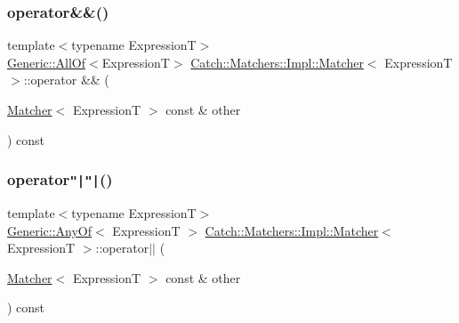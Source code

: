 \subsubsection{\texorpdfstring{operator\&\&()}{operator\&\&()}}
{\footnotesize\ttfamily template$<$typename ExpressionT$>$ \\
\hyperlink{class_catch_1_1_matchers_1_1_impl_1_1_generic_1_1_all_of}{Generic\+::\+All\+Of}$<$ExpressionT$>$ \hyperlink{struct_catch_1_1_matchers_1_1_impl_1_1_matcher}{Catch\+::\+Matchers\+::\+Impl\+::\+Matcher}$<$ ExpressionT $>$\+::operator \&\& (\begin{DoxyParamCaption}\item[{\hyperlink{struct_catch_1_1_matchers_1_1_impl_1_1_matcher}{Matcher}$<$ ExpressionT $>$ const \&}]{other }\end{DoxyParamCaption}) const}

\hypertarget{struct_catch_1_1_matchers_1_1_impl_1_1_matcher_a55b1e12315e7a5daf7ce7a11ddfaa295}{}\label{struct_catch_1_1_matchers_1_1_impl_1_1_matcher_a55b1e12315e7a5daf7ce7a11ddfaa295} 
\subsubsection{\texorpdfstring{operator\texttt{"|}\texttt{"|}()}{operator||()}}
{\footnotesize\ttfamily template$<$typename ExpressionT$>$ \\
\hyperlink{class_catch_1_1_matchers_1_1_impl_1_1_generic_1_1_any_of}{Generic\+::\+Any\+Of}$<$ ExpressionT $>$ \hyperlink{struct_catch_1_1_matchers_1_1_impl_1_1_matcher}{Catch\+::\+Matchers\+::\+Impl\+::\+Matcher}$<$ ExpressionT $>$\+::operator$\vert$$\vert$ (\begin{DoxyParamCaption}\item[{\hyperlink{struct_catch_1_1_matchers_1_1_impl_1_1_matcher}{Matcher}$<$ ExpressionT $>$ const \&}]{other }\end{DoxyParamCaption}) const}

\hypertarget{struct_catch_1_1_matchers_1_1_impl_1_1_matcher_a091bcc37e589967d7e10fc7790d820e2}{}\label{struct_catch_1_1_matchers_1_1_impl_1_1_matcher_a091bcc37e589967d7e10fc7790d820e2} 
